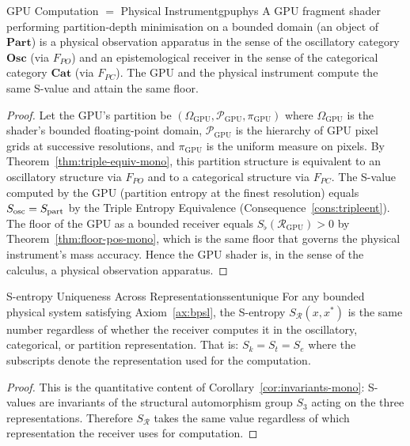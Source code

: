 \begin{consequence}{GPU Computation $=$ Physical Instrument}{gpuphys}
A GPU fragment shader performing partition-depth minimisation on a bounded
domain (an object of $\mathbf{Part}$) is a physical observation apparatus in
the sense of the oscillatory category $\mathbf{Osc}$ (via $F_{PO}$) and an
epistemological receiver in the sense of the categorical category $\mathbf{Cat}$
(via $F_{PC}$).  The GPU and the physical instrument compute the same S-value
and attain the same floor.
\end{consequence}

\begin{proof}
Let the GPU's partition be $(\Omega_{\mathrm{GPU}}, \mathscr{P}_{\mathrm{GPU}},
\pi_{\mathrm{GPU}})$ where $\Omega_{\mathrm{GPU}}$ is the shader's bounded
floating-point domain, $\mathscr{P}_{\mathrm{GPU}}$ is the hierarchy of GPU
pixel grids at successive resolutions, and $\pi_{\mathrm{GPU}}$ is the uniform
measure on pixels.  By Theorem~\ref{thm:triple-equiv-mono}, this partition
structure is equivalent to an oscillatory structure via $F_{PO}$ and to a
categorical structure via $F_{PC}$.  The S-value computed by the GPU
(partition entropy at the finest resolution) equals $S_{\mathrm{osc}} = S_{\mathrm{part}}$ by the Triple
Entropy Equivalence (Consequence~\ref{cons:tripleent}).  The floor of the GPU
as a bounded receiver equals $S_\flat(\mathcal{R}_{\mathrm{GPU}}) > 0$ by
Theorem~\ref{thm:floor-pos-mono}, which is the same floor that governs the
physical instrument's mass accuracy.  Hence the GPU shader is, in the sense
of the calculus, a physical observation apparatus.
\end{proof}

\begin{consequence}{S-entropy Uniqueness Across Representations}{sentunique}
For any bounded physical system satisfying Axiom~\ref{ax:bpsl}, the S-entropy
$S_{\mathcal{R}}(x, x^{*})$ is the same number regardless of whether the
receiver computes it in the oscillatory, categorical, or partition
representation.  That is: $S_k = S_t = S_e$ where the subscripts denote the
representation used for the computation.
\end{consequence}

\begin{proof}
This is the quantitative content of Corollary~\ref{cor:invariants-mono}: S-values
are invariants of the structural automorphism group $S_3$ acting on the three
representations.  Therefore $S_{\mathcal{R}}$ takes the same value regardless
of which representation the receiver uses for computation.
\end{proof}

